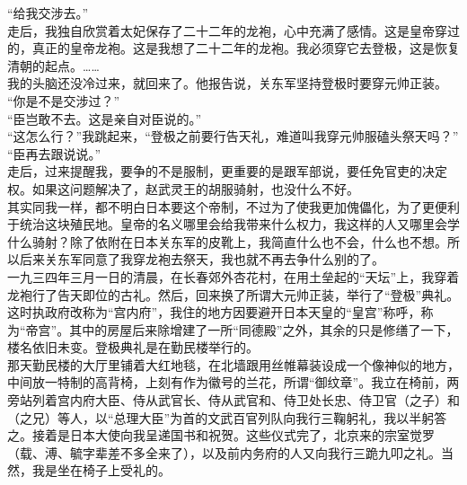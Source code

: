 “给我交涉去。”\\

走后，我独自欣赏着太妃保存了二十二年的龙袍，心中充满了感情。这是皇帝穿过的，真正的皇帝龙袍。这是我想了二十二年的龙袍。我必须穿它去登极，这是恢复清朝的起点。……\\

我的头脑还没冷过来，就回来了。他报告说，关东军坚持登极时要穿元帅正装。\\

“你是不是交涉过？”\\

“臣岂敢不去。这是亲自对臣说的。”\\

“这怎么行？”我跳起来，“登极之前要行告天礼，难道叫我穿元帅服磕头祭天吗？”\\

“臣再去跟说说。”\\

走后，过来提醒我，要争的不是服制，更重要的是跟军部说，要任免官吏的决定权。如果这问题解决了，赵武灵王的胡服骑射，也没什么不好。\\

其实同我一样，都不明白日本要这个帝制，不过为了使我更加傀儡化，为了更便利于统治这块殖民地。皇帝的名义哪里会给我带来什么权力，我这样的人又哪里会学什么骑射？除了依附在日本关东军的皮靴上，我简直什么也不会，什么也不想。所以后来关东军同意了我穿龙袍去祭天，我也就不再去争什么别的了。\\

一九三四年三月一日的清晨，在长春郊外杏花村，在用土垒起的“天坛”上，我穿着龙袍行了告天即位的古礼。然后，回来换了所谓大元帅正装，举行了“登极”典礼。这时执政府改称为“宫内府”，我住的地方因要避开日本天皇的“皇宫”称呼，称为“帝宫”。其中的房屋后来除增建了一所“同德殿”之外，其余的只是修缮了一下，楼名依旧未变。登极典礼是在勤民楼举行的。\\

那天勤民楼的大厅里铺着大红地毯，在北墙跟用丝帷幕装设成一个像神似的地方，中间放一特制的高背椅，上刻有作为徽号的兰花，所谓“御纹章”。我立在椅前，两旁站列着宫内府大臣、侍从武官长、侍从武官和、侍卫处长忠、侍卫官（之子）和（之兄）等人，以“总理大臣”为首的文武百官列队向我行三鞠躬礼，我以半躬答之。接着是日本大使向我呈递国书和祝贺。这些仪式完了，北京来的宗室觉罗（载、溥、毓字辈差不多全来了），以及前内务府的人又向我行三跪九叩之礼。当然，我是坐在椅子上受礼的。\\

